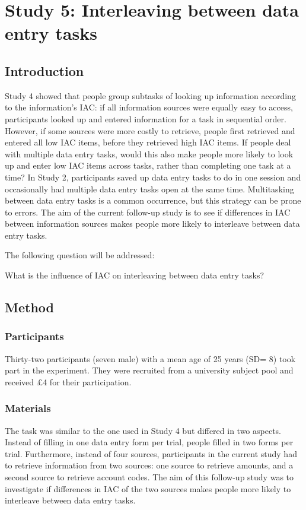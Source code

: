 \section{Study 5: Interleaving between data entry tasks}
 
\subsection{Introduction}
Study 4 showed that people group subtasks of looking up information according to the information's IAC: if all information sources were equally easy to access, participants looked up and entered information for a task in sequential order. However, if some sources were more costly to retrieve, people first retrieved and entered all low IAC items, before they retrieved high IAC items.
If people deal with multiple data entry tasks, would this also make people more likely to look up and enter low IAC items across tasks, rather than completing one task at a time? 
In Study 2, participants saved up data entry tasks to do in one session and occasionally had multiple data entry tasks open at the same time. Multitasking between data entry tasks is a common occurrence, but this strategy can be prone to errors.
The aim of the current follow-up study is to see if differences in IAC between information sources makes people more likely to interleave between data entry tasks.

The following question will be addressed:

What is the influence of IAC on interleaving between data entry tasks?

\subsection{Method}
\subsubsection{Participants}
Thirty-two participants (seven male) with a mean age of 25 years (SD= 8) took part in the experiment. They were recruited from a university subject pool and received $\pounds$4 for their participation.

\subsubsection{Materials}
The task was similar to the one used in Study 4 but differed in two aspects. Instead of filling in one data entry form per trial, people filled in two forms per trial. Furthermore, instead of four sources, participants in the current study had to retrieve information from two sources: one source to retrieve amounts, and a second source to retrieve account codes. The aim of this follow-up study was to investigate if differences in IAC of the two sources makes people more likely to interleave between data entry tasks.

